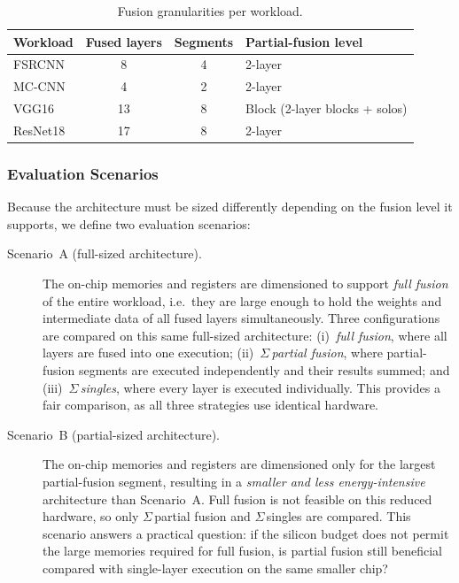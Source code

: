 \begin{table}[htbp]
  \centering
  \caption{Fusion granularities per workload.}
  \label{tab:fusion-levels}
  \small
  \begin{tabular}{l c c l}
    \toprule
    \textbf{Workload}
      & \textbf{Fused layers}
      & \textbf{Segments}
      & \textbf{Partial-fusion level} \\
    \midrule
    FSRCNN   &  8 & 4 & 2-layer \\
    MC-CNN   &  4 & 2 & 2-layer \\
    VGG16    & 13 & 8 & Block (2-layer blocks + solos) \\
    ResNet18 & 17 & 8 & 2-layer \\
    \bottomrule
  \end{tabular}
\end{table}

\subsubsection{Evaluation Scenarios}
\label{sec:scenarios}

Because the architecture must be sized differently depending on the
fusion level it supports, we define two evaluation scenarios:

\begin{description}
  \item[Scenario~A (full-sized architecture).]
    The on-chip memories and registers are dimensioned to support
    \emph{full fusion} of the entire workload, i.e.\ they are large
    enough to hold the weights and intermediate data of all fused layers
    simultaneously.
    Three configurations are compared on this same full-sized
    architecture:
    (i)~\emph{full fusion}, where all layers are fused into one
    execution;
    (ii)~$\Sigma$\,\emph{partial fusion}, where partial-fusion
    segments are executed independently and their results summed; and
    (iii)~$\Sigma$\,\emph{singles}, where every layer is executed
    individually.
    This provides a fair comparison, as all three strategies use
    identical hardware.

  \item[Scenario~B (partial-sized architecture).]
    The on-chip memories and registers are dimensioned only for the
    largest partial-fusion segment, resulting in a \emph{smaller and
    less energy-intensive} architecture than Scenario~A.
    Full fusion is not feasible on this reduced hardware, so only
    $\Sigma$\,partial fusion and $\Sigma$\,singles are compared.
    This scenario answers a practical question: if the silicon budget
    does not permit the large memories required for full fusion, is
    partial fusion still beneficial compared with single-layer
    execution on the same smaller chip?
\end{description}

